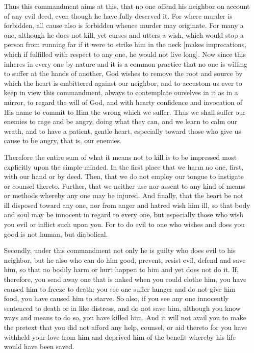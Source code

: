 Thus this commandment aims at this, that no one offend his neighbor on
account of any evil deed, even though he have fully deserved it. For
where murder is forbidden, all cause also is forbidden whence murder
may originate. For many a one, although he does not kill, yet curses
and utters a wish, which would stop a person from running far if it
were to strike him in the neck [makes imprecations, which if fulfilled
with respect to any one, he would not live long]. Now since this
inheres in every one by nature and it is a common practice that no one
is willing to suffer at the hands of another, God wishes to remove the
root and source by which the heart is embittered against our neighbor,
and to accustom us ever to keep in view this commandment, always to
contemplate ourselves in it as in a mirror, to regard the will of God,
and with hearty confidence and invocation of His name to commit to Him
the wrong which we suffer. Thus we shall suffer our enemies to rage and
be angry, doing what they can, and we learn to calm our wrath, and to
have a patient, gentle heart, especially toward those who give us cause
to be angry, that is, our enemies.

Therefore the entire sum of what it means not to kill is to be
impressed most explicitly upon the simple-minded. In the first place
that we harm no one, first, with our hand or by deed. Then, that we do
not employ our tongue to instigate or counsel thereto. Further, that we
neither use nor assent to any kind of means or methods whereby any one
may be injured. And finally, that the heart be not ill disposed toward
any one, nor from anger and hatred wish him ill, so that body and soul
may be innocent in regard to every one, but especially those who wish
you evil or inflict such upon you. For to do evil to one who wishes and
does you good is not human, but diabolical.

Secondly, under this commandment not only he is guilty who does evil to
his neighbor, but he also who can do him good, prevent, resist evil,
defend and save him, so that no bodily harm or hurt happen to him and
yet does not do it. If, therefore, you send away one that is naked when
you could clothe him, you have caused him to freeze to death; you see
one suffer hunger and do not give him food, you have caused him to
starve. So also, if you see any one innocently sentenced to death or in
like distress, and do not save him, although you know ways and means to
do so, you have killed him. And it will not avail you to make the
pretext that you did not afford any help, counsel, or aid thereto for
you have withheld your love from him and deprived him of the benefit
whereby his life would have been saved.

